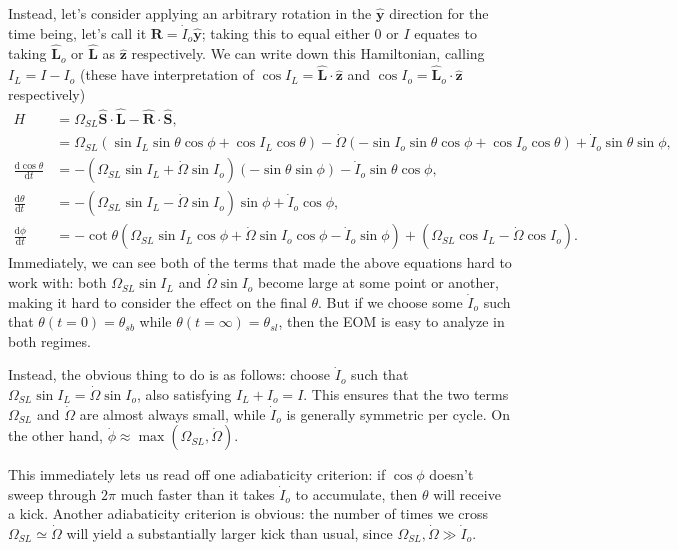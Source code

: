\documentclass[11pt,
        usenames, %
        dvipsnames %
    ]{article}
\newcommand*{\rd}[2]{\frac{\mathrm{d}#1}{\mathrm{d}#2}}
\newcommand*{\bm}[1]{\boldsymbol{\mathbf{#1}}}
\newcommand*{\uv}[1]{\hat{\bm{#1}}}
\newcommand*{\p}[1]{\left(#1\right)}
\begin{document}
Instead, let's consider applying an arbitrary rotation in the $\uv{y}$
direction for the time being, let's call it $\bm{R} = \dot{I}_o \uv{y}$; taking
this to equal either $0$ or $I$ equates to taking $\uv{L}_o$ or $\uv{L}$ as
$\uv{z}$ respectively. We can write down this Hamiltonian, calling $I_L = I -
I_o$ (these have interpretation of $\cos I_L = \uv{L} \cdot \uv{z}$ and $\cos
I_o = \uv{L}_o \cdot \uv{z}$ respectively)
\begin{align}
    H &= \Omega_{SL} \uv{S} \cdot \uv{L} - \uv{R} \cdot \uv{S},\\
        &= \Omega_{SL}\p{\sin I_L \sin \theta \cos \phi
            + \cos I_L \cos \theta}
            - \dot{\Omega}\p{-\sin I_{o} \sin \theta \cos \phi
                + \cos I_o \cos \theta}
            + \dot{I}_o \sin \theta \sin \phi,\\
    \rd{\cos \theta}{t}
        &= -\p{\Omega_{SL} \sin I_L + \dot{\Omega} \sin I_o}\p{-\sin \theta \sin
            \phi}
            - \dot{I}_o \sin \theta \cos \phi,\\
    \rd{\theta}{t}
        &= -\p{\Omega_{SL} \sin I_L - \dot{\Omega} \sin I_o}\sin \phi
            + \dot{I}_o \cos \phi,\\
    \rd{\phi}{t}
        &= -\cot \theta\p{\Omega_{SL}\sin I_L \cos \phi
                + \dot{\Omega}\sin I_o \cos \phi
                - \dot{I}_o \sin \phi}
            + \p{\Omega_{SL}\cos I_L - \dot{\Omega}\cos I_o}.
\end{align}
Immediately, we can see both of the terms that made the above equations hard to
work with: both $\Omega_{SL}\sin I_L$ and $\dot{\Omega} \sin I_{o}$ become
large at some point or another, making it hard to consider the effect on the
final $\theta$. But if we choose some $\dot{I}_o$ such that $\theta(t = 0) =
\theta_{sb}$ while $\theta(t = \infty) = \theta_{sl}$, then the EOM is easy to
analyze in both regimes.

Instead, the obvious thing to do is as follows: choose $\dot{I}_o$ such that
$\Omega_{SL} \sin I_L = \dot{\Omega} \sin I_o$, also satisfying $I_L + I_o = I$.
This ensures that the two terms $\Omega_{SL}$ and $\dot{\Omega}$ are almost
always small, while $\dot{I}_o$ is generally symmetric per cycle. On the other
hand, $\dot{\phi} \approx \max\p{\Omega_{SL}, \dot{\Omega}}$.

This immediately lets us read off one adiabaticity criterion: if $\cos \phi$
doesn't sweep through $2\pi$ much faster than it takes $\dot{I}_o$ to
accumulate, then $\theta$ will receive a kick. Another adiabaticity criterion is
obvious: the number of times we cross $\Omega_{SL} \simeq \dot{\Omega}$ will
yield a substantially larger kick than usual, since $\Omega_{SL}, \dot{\Omega}
\gg \dot{I}_o$.
\end{document}
